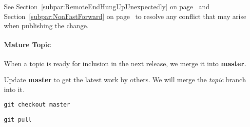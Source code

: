 See Section~\ref{subpar:RemoteEndHungUpUnexpectedly} on
page~\pageref{subpar:RemoteEndHungUpUnexpectedly} and
Section~\ref{subpar:NonFastForward} on page~\pageref{subpar:NonFastForward} to
resolve any conflict that may arise when publishing the change.


\paragraph{Mature Topic}
\label{par:MatureTopic}

When a topic is ready for inclusion in the next release, we merge it into
\textbf{master}.

Update \textbf{master} to get the latest work by others. We will merge the
\textit{topic} branch into it.

\begin{verbatim}
git checkout master
\end{verbatim}

\begin{figure}
\centering
{}
\label{fig:SwitchToMaster1}
\end{figure}

\begin{verbatim}
git pull
\end{verbatim}

\begin{figure}
\centering
{}
\label{fig:PullChanges2}
\end{figure}

